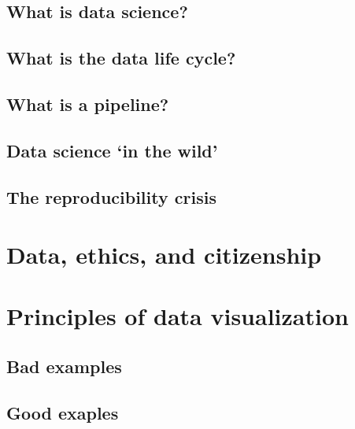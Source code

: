 \documentclass[
]{book}
\begin{document}
\hypertarget{what-is-data-science}{%
\subsection{What is data science?}\label{what-is-data-science}}

\hypertarget{what-is-the-data-life-cycle}{%
\subsection{What is the data life cycle?}\label{what-is-the-data-life-cycle}}

\hypertarget{what-is-a-pipeline}{%
\subsection{What is a pipeline?}\label{what-is-a-pipeline}}

\hypertarget{data-science-in-the-wild}{%
\subsection{Data science `in the wild'}\label{data-science-in-the-wild}}

\hypertarget{the-reproducibility-crisis}{%
\subsection{The reproducibility crisis}\label{the-reproducibility-crisis}}

\hypertarget{data-ethics-and-citizenship}{%
\section{Data, ethics, and citizenship}\label{data-ethics-and-citizenship}}

\hypertarget{principles-of-data-visualization}{%
\section{Principles of data visualization}\label{principles-of-data-visualization}}

\hypertarget{bad-examples}{%
\subsection{Bad examples}\label{bad-examples}}

\hypertarget{good-exaples}{%
\subsection{Good exaples}\label{good-exaples}}
\end{document}
